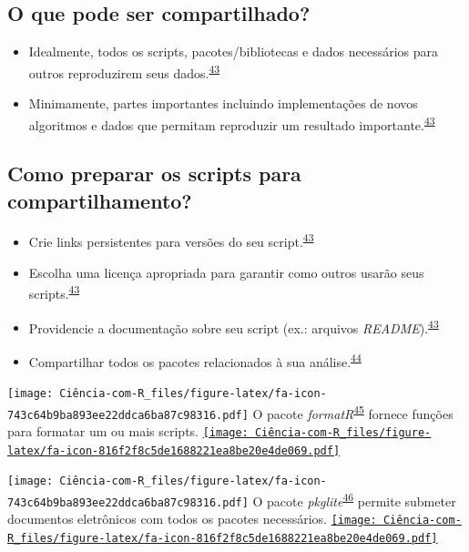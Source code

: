 \documentclass[
]{book}
\begin{document}
\hypertarget{o-que-pode-ser-compartilhado}{%
\subsection{O que pode ser compartilhado?}\label{o-que-pode-ser-compartilhado}}

\begin{itemize}
\item
  Idealmente, todos os scripts, pacotes/bibliotecas e dados necessários para outros reproduzirem seus dados.\textsuperscript{\protect\hyperlink{ref-Eglen2017}{43}}
\item
  Minimamente, partes importantes incluindo implementações de novos algoritmos e dados que permitam reproduzir um resultado importante.\textsuperscript{\protect\hyperlink{ref-Eglen2017}{43}}
\end{itemize}

\hypertarget{como-preparar-os-scripts-para-compartilhamento}{%
\subsection{Como preparar os scripts para compartilhamento?}\label{como-preparar-os-scripts-para-compartilhamento}}

\begin{itemize}
\item
  Crie links persistentes para versões do seu script.\textsuperscript{\protect\hyperlink{ref-Eglen2017}{43}}
\item
  Escolha uma licença apropriada para garantir como outros usarão seus scripts.\textsuperscript{\protect\hyperlink{ref-Eglen2017}{43}}
\item
  Providencie a documentação sobre seu script (ex.: arquivos \emph{README}).\textsuperscript{\protect\hyperlink{ref-Eglen2017}{43}}
\item
  Compartilhar todos os pacotes relacionados à sua análise.\textsuperscript{\protect\hyperlink{ref-Zhao2023}{44}}
\end{itemize}

\texttt{[image: Ciência-com-R\_files/figure-latex/fa-icon-743c64b9ba893ee22ddca6ba87c98316.pdf]} O pacote \emph{formatR}\textsuperscript{\protect\hyperlink{ref-formatR}{45}} fornece funções para formatar um ou mais scripts. \href{https://cran.r-project.org/web/packages/formatR/index.html}{\texttt{[image: Ciência-com-R\_files/figure-latex/fa-icon-816f2f8c5de1688221ea8be20e4de069.pdf]}}

\texttt{[image: Ciência-com-R\_files/figure-latex/fa-icon-743c64b9ba893ee22ddca6ba87c98316.pdf]} O pacote \emph{pkglite}\textsuperscript{\protect\hyperlink{ref-pkglite}{46}} permite submeter documentos eletrônicos com todos os pacotes necessários. \href{https://cran.rstudio.com/web/packages/pkglite/index.html}{\texttt{[image: Ciência-com-R\_files/figure-latex/fa-icon-816f2f8c5de1688221ea8be20e4de069.pdf]}}
\end{document}
